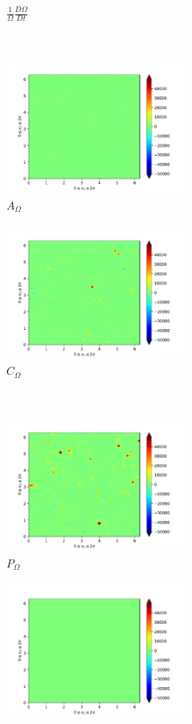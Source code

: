 \begin{figure}[H]
\begin{subfigure}[H]{0.45\textwidth}
        \caption{$\frac{1}{\Omega} \frac{D \Omega}{Dt}$}
    \end{subfigure}
    ~
    \begin{subfigure}{0.45\textwidth}
        \includegraphics[height=1.75in]{media/run-cds-65-25k/A-enst-449.png}
        \caption{$A_{\Omega}$}
    \end{subfigure}
    \newline
    \begin{subfigure}{0.45\textwidth}
        \includegraphics[height=1.75in]{media/run-cds-65-25k/Pi-enst-449.png}
        \caption{$C_{\Omega}$}
    \end{subfigure}
    ~
    \begin{subfigure}{0.45\textwidth}
        \includegraphics[height=1.75in]{media/run-cds-65-25k/P-enst-449.png}
        \caption{$P_{\Omega}$}
    \end{subfigure}
    \newline
    \begin{subfigure}{0.45\textwidth}
        \includegraphics[height=1.75in]{media/run-cds-65-25k/B-enst-449.png}

\end{subfigure}
\end{figure}
